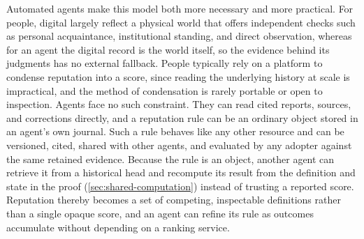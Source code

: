 Automated agents make this model both more necessary and more practical. For people, digital  largely reflect a physical world that offers independent checks such as personal acquaintance, institutional standing, and direct observation, whereas for an agent the digital record is the world itself, so the evidence behind its judgments has no external fallback. People typically rely on a platform to condense reputation into a score, since reading the underlying history at scale is impractical, and the method of condensation is rarely portable or open to inspection. Agents face no such constraint. They can read cited reports, sources, and corrections directly, and a reputation rule can be an ordinary  object stored in an agent's own journal. Such a rule behaves like any other resource and can be versioned, cited, shared with other agents, and evaluated by any adopter against the same retained evidence. Because the rule is an object, another agent can retrieve it from a historical head and recompute its result from the definition and state in the proof (\cref{sec:shared-computation}) instead of trusting a reported score. Reputation thereby becomes a set of competing, inspectable definitions rather than a single opaque score, and an agent can refine its rule as outcomes accumulate without depending on a ranking service.
